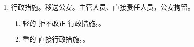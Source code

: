\begin{enumerate}
\begin{enumerate}
\begin{enumerate}
\begin{enumerate}
                        \end{enumerate}
                \end{enumerate}
          \item 行政措施。\yi 移送公安。\er 主管人员、直接责任人员，公安拘留。
                \begin{enumerate}
                  \item 轻的 \yjt 拒不改正 \yjt 行政措施。。
                  \item 重的 \yjt 直接行政措施。。
                \end{enumerate}
        \end{enumerate}
\end{enumerate}
